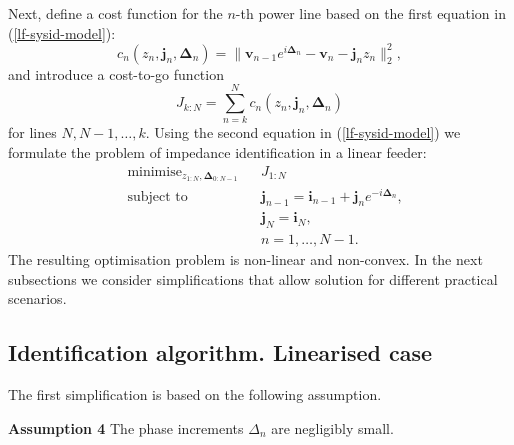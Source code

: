 \documentclass[journal,10pt,onecolumn,draftclsnofoot,]{IEEEtran}
\theoremstyle{plain}
\theoremstyle{definition}
\theoremstyle{remark}
\DeclareMathOperator{\minimise}{minimise}
\DeclareMathOperator{\st}{subject ~ to}
\begin{document}
Next, define a cost function for the $n$-th power line based on the first equation in (\ref{lf-sysid-model}): 
\begin{equation}
c_n(z_{n}, \bm{j}_n, \bm{\Delta}_{n}) = \Big\| \bm{v}_{n-1}e^{i\bm{\Delta}_{n}} - \bm{v}_{n} - \bm{j}_{n}z_{n} \Big\|_2^2,
\label{cost_function}
\end{equation} 
and introduce a cost-to-go function
\begin{equation}
J_{k:N} = \sum_{n = k}^{N} c_n(z_{n}, \bm{j}_n, \bm{\Delta}_{n})
\label{total_cost}
\end{equation}
for lines $N, N-1, \ldots, k$. Using the second equation in (\ref{lf-sysid-model}) we formulate the problem of impedance identification in a linear feeder:
\begin{equation}
\begin{aligned}
& \minimise_{z_{1:N}, \bm{\Delta}_{0:N-1}}
& & J_{1:N} \\
& \st
& & \bm{j}_{n-1} = \bm{i}_{n-1} + \bm{j}_{n}e^{-i\bm{\Delta}_{n}}, \\
&&& \bm{j}_{N} = \bm{i}_{N}, \\
&&& n = 1,\ldots, N-1.
\end{aligned}
\label{pf_network}
\end{equation}
The resulting optimisation problem is non-linear and non-convex. In the next subsections we consider simplifications that allow solution for different practical scenarios.

\subsection{Identification algorithm. Linearised case}

The first simplification is based on the following assumption.

\textbf{Assumption 4} The phase increments $\Delta_n$ are negligibly small. 
\end{document}
